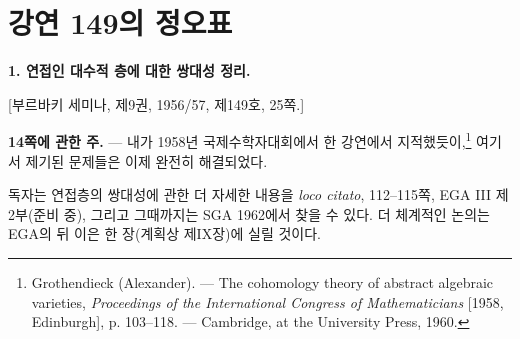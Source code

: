 \clearpage
\chapter*{강연 149의 정오표}
\setcounter{footnote}{0}

\noindent\textbf{1. 연접인 대수적 층에 대한 쌍대성 정리.}

\begin{center}
[부르바키 세미나, 제9권, 1956/57, 제149호, 25쪽.]
\end{center}

\noindent\textbf{14쪽에 관한 주.} --- 내가 1958년 국제수학자대회에서 한
강연에서 지적했듯이,\footnote{
Grothendieck (Alexander). --- The cohomology theory of abstract algebraic
varieties, \emph{Proceedings of the International Congress of Mathematicians}
[1958, Edinburgh], p. 103--118. --- Cambridge, at the University Press, 1960.}
여기서 제기된 문제들은 이제 완전히 해결되었다.

독자는 연접층의 쌍대성에 관한 더 자세한 내용을
\emph{loco citato}\footnotemark[1], 112--115쪽, EGA III 제2부(준비 중),
그리고 그때까지는 SGA 1962에서 찾을 수 있다. 더 체계적인 논의는 EGA의
뒤 이은 한 장(계획상 제IX장)에 실릴 것이다.
